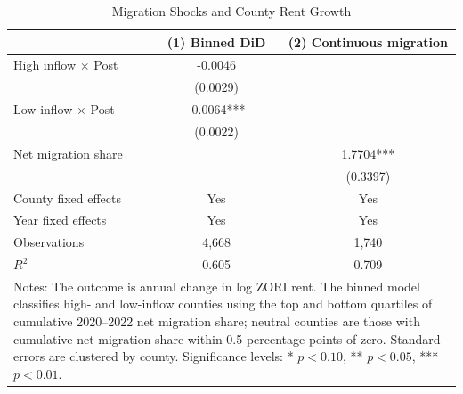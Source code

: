 \begin{table}[!htbp]\centering
\caption{Migration Shocks and County Rent Growth}
\label{tab:main_results}
\begin{tabular}{lcc}
\toprule
 & (1) Binned DiD & (2) Continuous migration \\
\midrule
High inflow $\times$ Post
  & -0.0046 &  \\
  & (0.0029) &  \\
Low inflow $\times$ Post
  & -0.0064*** &  \\
  & (0.0022) &  \\
Net migration share
  &  & 1.7704*** \\
  &  & (0.3397) \\
\midrule
County fixed effects & Yes & Yes \\
Year fixed effects & Yes & Yes \\
Observations & 4,668 & 1,740 \\
$R^2$ & 0.605 & 0.709 \\
\bottomrule
\multicolumn{3}{p{0.82\textwidth}}{\footnotesize Notes: The outcome is annual change in log ZORI rent. The binned model classifies high- and low-inflow counties using the top and bottom quartiles of cumulative 2020--2022 net migration share; neutral counties are those with cumulative net migration share within 0.5 percentage points of zero. Standard errors are clustered by county. Significance levels: * $p<0.10$, ** $p<0.05$, *** $p<0.01$.}
\end{tabular}
\end{table}
